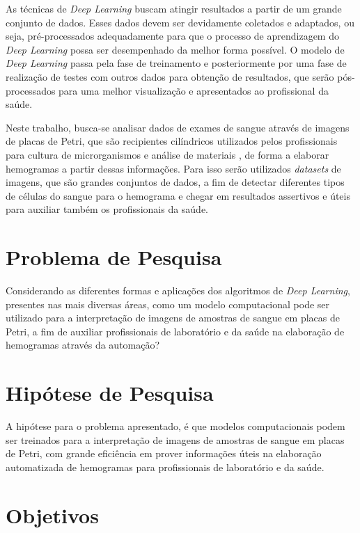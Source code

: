 As técnicas de \emph{Deep Learning} buscam atingir resultados a partir de um grande conjunto de dados. Esses dados devem ser devidamente coletados e adaptados, ou seja, pré-processados adequadamente para que o processo de aprendizagem do \emph{Deep Learning} possa ser desempenhado da melhor forma possível. O modelo de \emph{Deep Learning} passa pela fase de treinamento e posteriormente por uma fase de realização de testes com outros dados para obtenção de resultados, que serão pós-processados para uma melhor visualização e apresentados ao profissional da saúde.

Neste trabalho, busca-se analisar dados de exames de sangue através de imagens de placas de Petri, que são recipientes cilíndricos utilizados pelos profissionais para cultura de microrganismos e análise de materiais \cite{petri}, de forma a elaborar hemogramas a partir dessas informações. Para isso serão utilizados \emph{datasets} de imagens, que são grandes conjuntos de dados, a fim de detectar diferentes tipos de células do sangue para o hemograma e chegar em resultados assertivos e úteis para auxiliar também os profissionais da saúde.

\section{Problema de Pesquisa}
\label{sec:problema}

Considerando as diferentes formas e aplicações dos algoritmos de \emph{Deep Learning}, presentes nas mais diversas áreas, como um modelo computacional pode ser utilizado para a interpretação de imagens de amostras de sangue em placas de Petri, a fim de auxiliar profissionais de laboratório e da saúde na elaboração de hemogramas através da automação?

\section{Hipótese de Pesquisa}
\label{sec:hipotese}

A hipótese para o problema apresentado, é que modelos computacionais podem ser treinados para a interpretação de imagens de amostras de sangue em placas de Petri, com grande eficiência em prover informações úteis na elaboração automatizada de hemogramas para profissionais de laboratório e da saúde.

\section{Objetivos}
\label{sec:objetivos}

